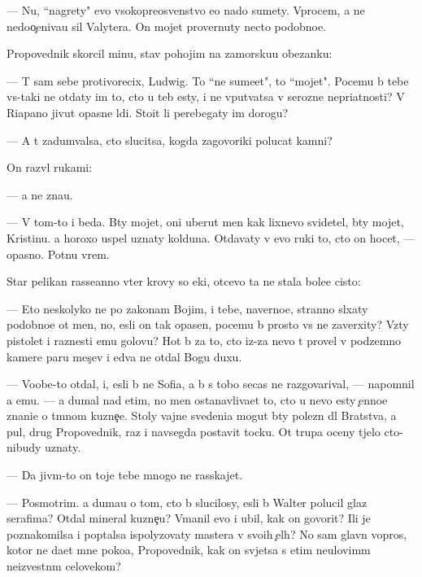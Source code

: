 \documentclass[10pt]{book}
\begin{document}
— Nu, ``nagrety" {\y}evo v{\yi}sokopreosv{\ia}{\x}enstvo {\y}e{\x}o nado sumety. Vprocem, {\y}a ne nedoo{\c}eniva{\y}u sil{\yi} Valytera. On mojet provernuty necto podobno{\y}e.

Propovednik skorcil minu, stav pohojim na zamorsku{\y}u obez{\y}anku:

— T{\yi} sam sebe protivorecix, Ludwig. To ``ne sume{\y}et", to ``mojet". Pocemu b{\yi} tebe vs{\e}-taki ne otdaty im to, cto u teb{\ia} {\y}esty, i ne vput{\yi}vatsa v ser{\y}ozn{\yi}{\y}e nepri{\y}atnosti? V Riapano jivut opasn{\yi}{\y}e l{\iu}di. Sto{\y}it li perebegaty im dorogu?

— A t{\yi} zadum{\yi}valsa, cto slucitsa, kogda zagovor{\x}iki polucat kamni?

On razv{\e}l rukami:

— {\Y}a ne zna{\y}u.

— V tom-to i beda. B{\yi}ty mojet, oni uberut men{\ia} kak lixnevo svidetel{\ia}, b{\yi}ty mojet, Kristinu. {\Y}a horoxo uspel uznaty kolduna. Otdavaty v {\y}evo ruki to, cto on hocet, — opasno. Pot{\ia}nu vrem{\ia}.

Star{\yi}{\y} pelikan rasse{\y}anno v{\yi}ter krovy so {\x}eki, otcevo ta ne stala bole{\y}e cisto{\y}:

— Eto neskolyko ne po zakonam Boj{\yf}im, i tebe, naverno{\y}e, stranno sl{\yi}xaty podobno{\y}e ot men{\ia}, no, {\y}esli on tak opasen, pocemu b{\yi} prosto vs{\e} ne zaverxity? Vz{\ia}ty pistolet i raznesti {\y}emu golovu? Hot{\ia} b{\yi} za to, cto iz-za nevo t{\yi} provel v podzemno{\y} kamere paru mes{\ia}{\c}ev i {\y}edva ne otdal Bogu duxu.

— Voob{\x}e-to otdal, i, {\y}esli b{\yi} ne Sofi{\y}a, {\y}a b{\yi} s tobo{\y} se{\y}cas ne razgovarival, — napomnil {\y}a {\y}emu. — {\Y}a dumal nad etim, no men{\ia} ostanavliva{\y}et to, cto u nevo {\y}esty {\c}enno{\y}e znani{\y}e o t{\e}mnom kuzne{\c}e. Stoly vajn{\yi}{\y}e svedeni{\y}a mogut b{\yi}ty polezn{\yi} dl{\ia} Bratstva, a pul{\ia}, drug Propovednik, raz i navsegda postavit tocku. Ot trupa oceny t{\ia}jelo cto-nibudy uznaty.

— Da jiv{\yi}m-to on toje tebe mnogo ne rasskajet.

— Posmotrim. {\Y}a duma{\y}u o tom, cto b{\yi} slucilosy, {\y}esli b{\yi} Walter polucil glaz serafima? Otdal mineral kuzne{\c}u? V{\yi}manil {\y}evo i ubil, kak on govorit? Ili je poznakomilsa i pop{\yi}talsa ispolyzovaty mastera v svo{\y}ih {\c}el{\ia}h? No sam{\yi}{\y} glavn{\yi}{\y} vopros, kotor{\yi}{\y} ne da{\y}et mne poko{\y}a, Propovednik, kak on sv{\ia}jetsa s etim neulovim{\yi}m ne{\y}izvestn{\yi}m celovekom?
\end{document}
